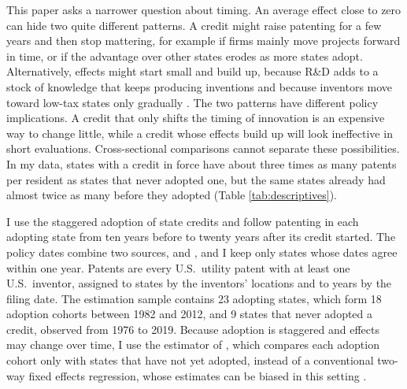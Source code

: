 \documentclass[12pt]{article}
\begin{document}
This paper asks a narrower question about timing. An average effect close to zero can hide two quite
different patterns. A credit might raise patenting for a few years and then stop mattering, for example if
firms mainly move projects forward in time, or if the advantage over other states erodes as more states adopt.
Alternatively, effects might start small and build up, because R\&D adds to a stock of knowledge that keeps
producing inventions \citep{griliches1979issues} and because inventors move toward low-tax states only
gradually \citep{moretti2017effect}. The two patterns have different policy implications. A credit that only
shifts the timing of innovation is an expensive way to change little, while a credit whose effects build up
will look ineffective in short evaluations. Cross-sectional comparisons cannot separate these possibilities.
In my data, states with a credit in force have about three times as many patents per resident as states that
never adopted one, but the same states already had almost twice as many before they adopted (Table
\ref{tab:descriptives}).

I use the staggered adoption of state credits and follow patenting in each adopting state from ten years
before to twenty years after its credit started. The policy dates combine two sources, \citet{wilson2009beggar}
and \citet{iowa2021research}, and I keep only states whose dates agree within one year. Patents are every U.S.\
utility patent with at least one U.S.\ inventor, assigned to states by the inventors' locations and to years
by the filing date. The estimation sample contains 23 adopting states, which form 18 adoption cohorts between
1982 and 2012, and 9 states that never adopted a credit, observed from 1976 to 2019. Because adoption is
staggered and effects may change over time, I use the estimator of \citet{callaway2021difference}, which
compares each adoption cohort only with states that have not yet adopted, instead of a conventional two-way
fixed effects regression, whose estimates can be biased in this setting
\citep{goodmanbacon2021difference,roth2023trending}.
\end{document}
